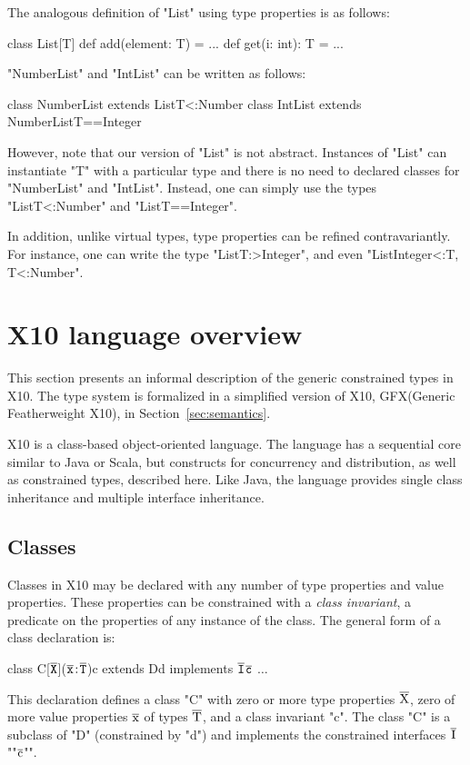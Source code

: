 \documentclass[preprint,nocopyrightspace,9pt]{sigplanconf}
\newcommand\gxx{GFX\xspace}
\newcommand\xbar[1]{\ensuremath{\bar{\Xcd{#1}}}}
\newcommand\tbar[1]{\ensuremath{\bar{\tt {#1}}}}
\begin{document}
The analogous definition of 
\xcd"List" using type properties is as follows:
\begin{xten}
class List[T] {
    def add(element: T) = { ... }
    def get(i: int): T = { ... }
}
\end{xten}

\noindent
\xcd"NumberList" and \xcd"IntList" can be written as follows:
\begin{xten}
class NumberList extends List{T<:Number} { }
class IntList extends NumberList{T==Integer} { }
\end{xten}

However, note that our version of \xcd"List" is not abstract.
Instances of \xcd"List"
can instantiate \xcd"T" with a particular type and there is no
need to declared classes for \xcd"NumberList" and \xcd"IntList".
Instead, one can simply use the types
\xcd"List{T<:Number}" and \xcd"List{T==Integer}".

In addition,
unlike virtual types, type properties can be refined contravariantly.
For instance, one can write the type \xcd"List{T:>Integer}",
and even \xcd"List{Integer<:T, T<:Number}".

\section{X10 language overview}
\label{sec:lang}

This section presents an informal description of the 
generic constrained types in X10.  The type system is formalized
in a simplified version of X10, \gxx (Generic Featherweight X10), in
Section~\ref{sec:semantics}.

X10 is a class-based object-oriented language.
The language has a sequential core similar to Java or Scala, but 
constructs
for concurrency and distribution, as well as constrained types,
described here.
Like Java, the language provides single class inheritance and
multiple interface inheritance.

\subsection{Classes}

Classes in X10 may be declared with any number of type properties and
value properties.  These properties can be constrained with a
\emph{class invariant},
a predicate on the properties of any instance of the class.
%
The general form of a class declaration is:
\begin{xtenmath}
class C[$\tbar{X}$]($\tbar{x} \ty \tbar{T}$){c} extends D{d}
      implements $\tbar{I}${$\tbar{c}$} { $\dots$ }
\end{xtenmath}
This declaration defines a class \xcd"C" with zero or more type properties
          \xbar{X}, zero of more value properties \xbar{x} of
          types \xbar{T}, and a class invariant \xcd"c".
          The class \xcd"C" is a subclass of \xcd"D"
          (constrained by \xcd"d")
          and implements the constrained
          interfaces \xbar{I}\xcd"{"\xbar{c}\xcd"}".
\end{document}
